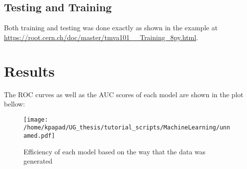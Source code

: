 \documentclass[11pt,a4paper]{article}
\begin{document}
\subsection{Testing and Training}
\label{sec:orgb7e5a42}
Both training and testing was done exactly as shown in the example at \url{https://root.cern.ch/doc/master/tmva101\_\_Training\_8py.html}.
\section{Results}
\label{sec:orge7ae33d}
The ROC curves as well as the AUC scores of each model are shown in the plot bellow:
\begin{figure}[htbp]
\centering
\texttt{[image: /home/kpapad/UG\_thesis/tutorial\_scripts/MachineLearning/unnamed.pdf]}
\caption{\label{fig:orgb648629}Efficiency of each model based on the way that the data was generated}
\end{figure}
\end{document}
